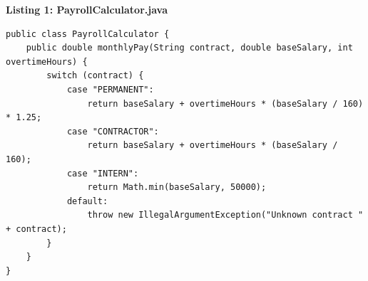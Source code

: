 \documentclass[border=10pt]{standalone}
\begin{document}
\pagecolor{paper}\begin{minipage}{17.0cm}\vspace{4pt}
\textbf{\small\color{gray}Listing 1: PayrollCalculator.java}\par\vspace{2pt}
\lstset{style=sv}
\begin{lstlisting}
public class PayrollCalculator {
    public double monthlyPay(String contract, double baseSalary, int overtimeHours) {
        switch (contract) {
            case "PERMANENT":
                return baseSalary + overtimeHours * (baseSalary / 160) * 1.25;
            case "CONTRACTOR":
                return baseSalary + overtimeHours * (baseSalary / 160);
            case "INTERN":
                return Math.min(baseSalary, 50000);
            default:
                throw new IllegalArgumentException("Unknown contract " + contract);
        }
    }
}
\end{lstlisting}
\vspace{2pt}\end{minipage}
\end{document}
